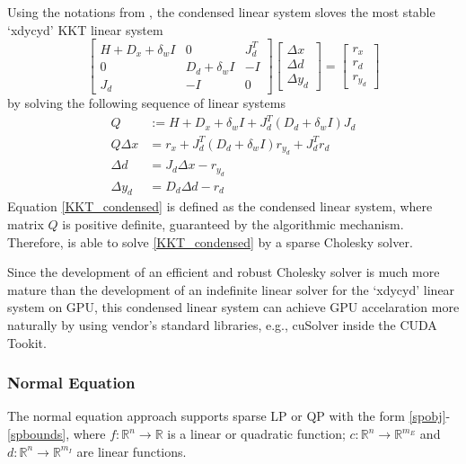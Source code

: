 Using the notations from \cite{petra_hiop}, the condensed linear system sloves the most stable `xdycyd' KKT linear system 
\begin{equation} \label{KKT_xdycyd_condensed}
  \begin{bmatrix} 
  H+D_x+\delta_{w}I & 0  & J_d^T\\
  0  & D_d + \delta_{w}I &  -I\\
  J_d & -I & 0 
  \end{bmatrix}
  \begin{bmatrix} \Delta x \\ \Delta d \\ \Delta y_d  \end{bmatrix} = 
  \begin{bmatrix} r_x \\ r_d \\ r_{y_d}\end{bmatrix} 
\end{equation}
by solving the following sequence of linear systems
\begin{align}
  Q & := H+D_x+\delta_wI + J_d^T(D_d+\delta_w I)J_d   \\
  Q\Delta x & = r_x + J_d^T(D_d+\delta_w I)r_{y_d} + J_d^T r_d \label{KKT_condensed} \\
  \Delta d & = J_d \Delta x- r_{y_d} \\
  \Delta y_d   & = D_d \Delta d - r_d 
\end{align}
Equation \eqref{KKT_condensed} is defined as the condensed linear system, where matrix $Q$ is positive definite, guaranteed by the algorithmic mechanism. Therefore, \Hi is able to solve \eqref{KKT_condensed} by a sparse Cholesky solver. 

Since the development of an efficient and robust Cholesky solver is much more mature than the development of an indefinite linear solver for the `xdycyd' linear system on GPU, this condensed linear system can achieve GPU accelaration more naturally by using vendor's standard libraries, e.g., cuSolver inside the CUDA Tookit.



\subsubsection{Normal Equation}

The normal equation approach supports sparse LP or QP with the form \eqref{spobj}-\eqref{spbounds}, where $f:\mathbb{R}^n\rightarrow\mathbb{R}$ is a linear or quadratic function; $c:\mathbb{R}^n\rightarrow\mathbb{R}^{m_E}$ and $d:\mathbb{R}^n\rightarrow\mathbb{R}^{m_I}$ are linear functions.

